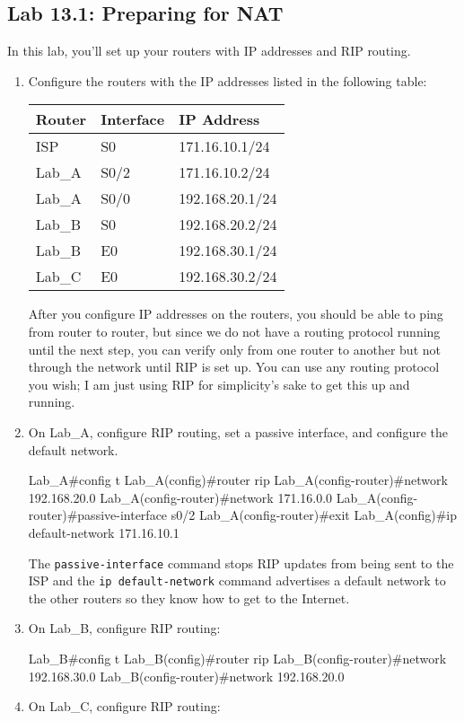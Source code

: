 \subsection{Lab 13.1: Preparing for NAT}

In this lab, you'll set up your routers with IP addresses and RIP
routing.

\begin{enumerate}
\item
  Configure the routers with the IP addresses listed in the following
  table:

  \begin{longtable}[]{@{}lll@{}}
  \toprule
  \textbf{Router} & \textbf{Interface} & \textbf{IP
  Address}\tabularnewline
  \midrule
  \endhead
  ISP & S0 & 171.16.10.1/24\tabularnewline
  Lab\_A & S0/2 & 171.16.10.2/24\tabularnewline
  Lab\_A & S0/0 & 192.168.20.1/24\tabularnewline
  Lab\_B & S0 & 192.168.20.2/24\tabularnewline
  Lab\_B & E0 & 192.168.30.1/24\tabularnewline
  Lab\_C & E0 & 192.168.30.2/24\tabularnewline
  \bottomrule
  \end{longtable}

  After you configure IP addresses on the routers, you should be able to
  ping from router to router, but since we do not have a routing
  protocol running until the next step, you can verify only from one
  router to another but not through the network until RIP is set up. You
  can use any routing protocol you wish; I am just using RIP for
  simplicity's sake to get this up and running.
\item
  On Lab\_A, configure RIP routing, set a passive interface, and
  configure the default network.

\begin{cli}
Lab_A#config t
Lab_A(config)#router rip
Lab_A(config-router)#network 192.168.20.0
Lab_A(config-router)#network 171.16.0.0
Lab_A(config-router)#passive-interface s0/2
Lab_A(config-router)#exit
Lab_A(config)#ip default-network 171.16.10.1
\end{cli}

  The \texttt{passive-interface} command stops RIP updates from being
  sent to the ISP and the \texttt{ip\ default-network} command
  advertises a default network to the other routers so they know how to
  get to the Internet.
\item
  On Lab\_B, configure RIP routing:

\begin{cli}
Lab_B#config t
Lab_B(config)#router rip
Lab_B(config-router)#network 192.168.30.0
Lab_B(config-router)#network 192.168.20.0
\end{cli}
\item
  On Lab\_C, configure RIP routing:


\end{enumerate}
